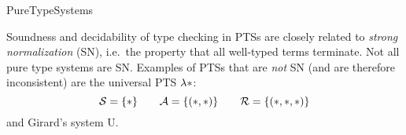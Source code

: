\begin{entry}{PureTypeSystems}
\begin{technicalities}
Soundness and decidability of type checking in PTSs are closely related to \emph{strong normalization} (SN), i.e.~the property that all well-typed terms terminate. Not all pure type systems are SN. Examples of PTSs that are \emph{not} SN (and are therefore inconsistent) are the universal PTS $\lambda{\ast}$:
\negvspace\[
  \sorts = \{\Prop\} \qquad \axioms = \{(\Prop, \Prop)\} \qquad \rules = \{(\Prop, \Prop, \Prop)\}
\negvspace\]
and Girard's system U.
\end{technicalities}



%
%
%
%
%
%
%
%












\end{entry}
